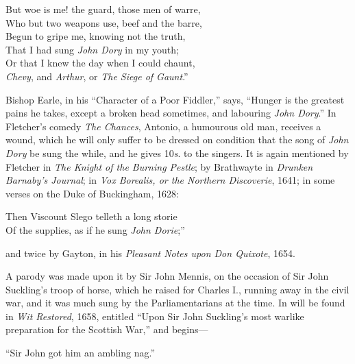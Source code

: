 \settowidth{\versewidth}{“But woe is me! the guard, those men of warre,}
\begin{scverse}
But woe is me! the guard, those men of warre,\\
Who but two weapons use, beef and the barre,\\
Begun to gripe me, knowing not the truth,\\
That I had sung \textit{John Dory} in my youth;\\
Or that I knew the day when I could chaunt,\\
\textit{Chevy}, and \textit{Arthur}, or \textit{The Siege of Gaunt}.”
\end{scverse}

Bishop Earle, in his “Character of a Poor Fiddler,” says, “Hunger is the greatest
pains he takes, except a broken head sometimes, and labouring \textit{John Dory}.” In
Fletcher’s comedy \textit{The Chances}, Antonio, a humourous old man, receives a wound,
which he will only suffer to be dressed on condition that the song of \textit{John Dory} be
sung the while, and he gives 10\textit{s}. to the singers. It is again mentioned by
Fletcher in \textit{The Knight of the Burning Pestle}; by Brathwayte in \textit{Drunken
Barnaby's Journal}; in \textit{Vox Borealis, or the Northern Discoverie}, 1641; in some
verses on the Duke of Buckingham, 1628:

\begin{scverse}
Then Viscount Slego telleth a long storie\\
Of the supplies, as if he sung \textit{John Dorie};”
\end{scverse}

\noindent and twice by Gayton, in his \textit{Pleasant Notes upon Don Quixote}, 1654.

A parody was made upon it by Sir John Mennis, on the occasion of Sir John
Suckling’s troop of horse, which he raised for Charles I., running away in the
civil war, and it was much sung by the Parliamentarians at the time. In will be
found in \textit{Wit Restored}, 1658, entitled “Upon Sir John Suckling’s most warlike
preparation for the Scottish War,” and begins—

\begin{scverse}
“Sir John got him an ambling nag.”
\end{scverse}

